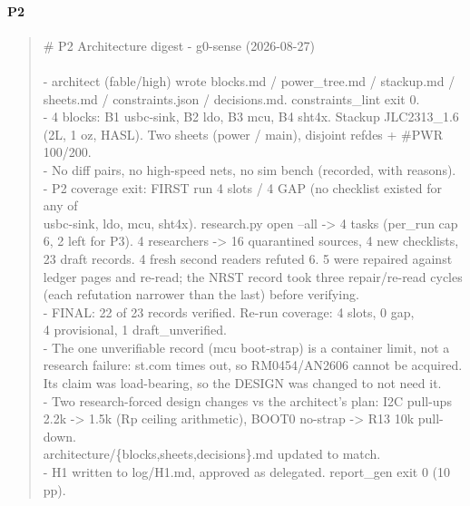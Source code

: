 \documentclass[11pt,a4paper]{article}
\begin{document}
\paragraph*{P2}
\begin{quote}\small\ttfamily\raggedright
\# P2 Architecture digest - g0-sense (2026-08-27)\\
~\\
- architect (fable/high) wrote blocks.md / power\_tree.md / stackup.md /\\
  sheets.md / constraints.json / decisions.md. constraints\_lint exit 0.\\
- 4 blocks: B1 usbc-sink, B2 ldo, B3 mcu, B4 sht4x. Stackup JLC2313\_1.6\\
  (2L, 1 oz, HASL). Two sheets (power / main), disjoint refdes + \#PWR 100/200.\\
- No diff pairs, no high-speed nets, no sim bench (recorded, with reasons).\\
- P2 coverage exit: FIRST run 4 slots / 4 GAP (no checklist existed for any of\\
  usbc-sink, ldo, mcu, sht4x). research.py open --all -\textgreater{} 4 tasks (per\_run cap\\
  6, 2 left for P3). 4 researchers -\textgreater{} 16 quarantined sources, 4 new checklists,\\
  23 draft records. 4 fresh second readers refuted 6. 5 were repaired against\\
  ledger pages and re-read; the NRST record took three repair/re-read cycles\\
  (each refutation narrower than the last) before verifying.\\
- FINAL: 22 of 23 records verified. Re-run coverage: 4 slots, 0 gap,\\
  4 provisional, 1 draft\_unverified.\\
- The one unverifiable record (mcu boot-strap) is a container limit, not a\\
  research failure: st.com times out, so RM0454/AN2606 cannot be acquired.\\
  Its claim was load-bearing, so the DESIGN was changed to not need it.\\
- Two research-forced design changes vs the architect's plan: I2C pull-ups\\
  2.2k -\textgreater{} 1.5k (Rp ceiling arithmetic), BOOT0 no-strap -\textgreater{} R13 10k pull-down.\\
  architecture/\{blocks,sheets,decisions\}.md updated to match.\\
- H1 written to log/H1.md, approved as delegated. report\_gen exit 0 (10 pp).
\end{quote}
\end{document}
